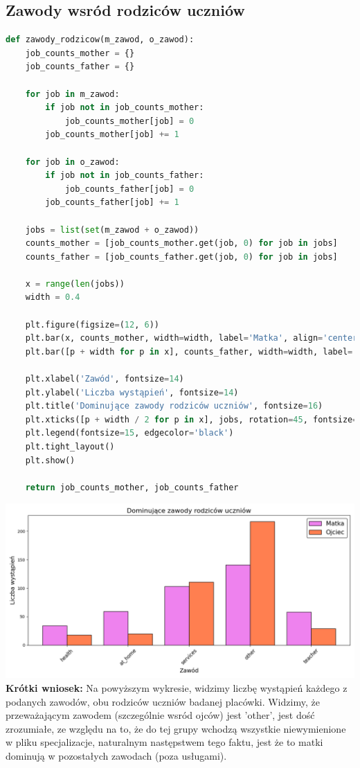 \documentclass{article}
\begin{document}
\subsection{Zawody wsród rodziców uczniów}
\begin{lstlisting}[language=Python]
def zawody_rodzicow(m_zawod, o_zawod):
    job_counts_mother = {}
    job_counts_father = {}

    for job in m_zawod:
        if job not in job_counts_mother:
            job_counts_mother[job] = 0
        job_counts_mother[job] += 1

    for job in o_zawod:
        if job not in job_counts_father:
            job_counts_father[job] = 0
        job_counts_father[job] += 1

    jobs = list(set(m_zawod + o_zawod))
    counts_mother = [job_counts_mother.get(job, 0) for job in jobs]
    counts_father = [job_counts_father.get(job, 0) for job in jobs]

    x = range(len(jobs))
    width = 0.4

    plt.figure(figsize=(12, 6))
    plt.bar(x, counts_mother, width=width, label='Matka', align='center', color='violet', edgecolor='black')
    plt.bar([p + width for p in x], counts_father, width=width, label='Ojciec', align='center', color='coral', edgecolor='black')

    plt.xlabel('Zawód', fontsize=14)
    plt.ylabel('Liczba wystąpień', fontsize=14)
    plt.title('Dominujące zawody rodziców uczniów', fontsize=16)
    plt.xticks([p + width / 2 for p in x], jobs, rotation=45, fontsize=12)
    plt.legend(fontsize=15, edgecolor='black')
    plt.tight_layout()
    plt.show()

    return job_counts_mother, job_counts_father
\end{lstlisting}
\includegraphics[width=\textwidth]{zawody_rodzicow.png}
\textbf{Krótki wniosek:} Na powyższym wykresie, widzimy liczbę wystąpień każdego z podanych zawodów, obu rodziców uczniów badanej placówki. Widzimy, że przeważającym zawodem (szczególnie wsród ojców) jest 'other', jest dość zrozumiałe, ze względu na to, że do tej grupy wchodzą wszystkie niewymienione w pliku specjalizacje, naturalnym następstwem tego faktu, jest że to matki dominują w pozostałych zawodach (poza usługami).
\end{document}
